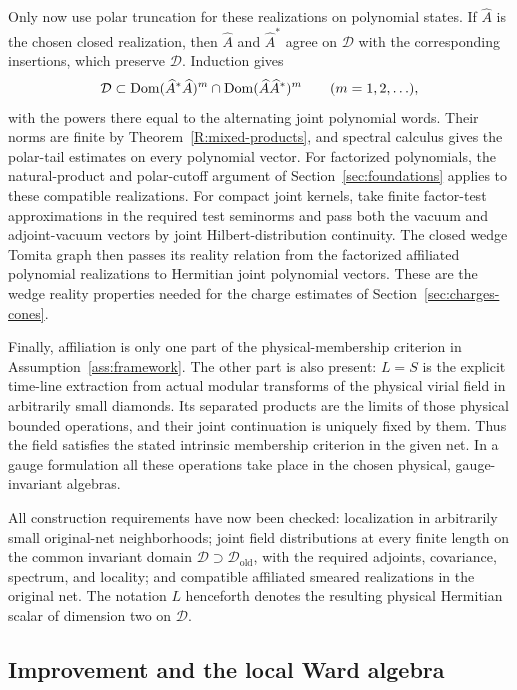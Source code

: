 Only now use polar truncation for these realizations on polynomial
states.  If $\widehat A$ is the chosen closed realization, then
$\widehat A$ and $\widehat A^*$ agree on $\mathcal D$ with the
corresponding insertions, which preserve $\mathcal D$.  Induction gives
\[
 \mathcal D\subset
 \operatorname{Dom}(\widehat A^*\widehat A)^m
       \cap\operatorname{Dom}(\widehat A\widehat A^*)^m
 \qquad(m=1,2,\ldots),
\]
with the powers there equal to the alternating joint polynomial
words.  Their norms are finite by Theorem~\ref{R:mixed-products},
and spectral calculus gives the polar-tail estimates on every
polynomial vector.  For factorized polynomials, the natural-product
and polar-cutoff argument of Section~\ref{sec:foundations} applies to
these compatible realizations.  For compact joint kernels, take finite factor-test
approximations in the required test seminorms and pass both the vacuum
and adjoint-vacuum vectors by joint Hilbert-distribution continuity.
The closed wedge Tomita graph then passes its reality relation from
the factorized affiliated polynomial realizations to Hermitian joint
polynomial vectors.  These are the wedge reality properties needed
for the charge estimates of Section~\ref{sec:charges-cones}.

Finally, affiliation is only one part of the physical-membership
criterion in Assumption~\ref{ass:framework}.  The other part is also
present: $L=S$ is the explicit time-line extraction from actual
modular transforms of the physical virial field in arbitrarily small
diamonds.  Its separated products are the limits of those physical
bounded operations, and their joint continuation is uniquely fixed
by them.  Thus the field satisfies the stated intrinsic membership
criterion in the given net.  In a gauge formulation all these
operations take place in the chosen physical, gauge-invariant
algebras.

All construction requirements have now been checked: localization
in arbitrarily small original-net neighborhoods; joint field distributions
at every finite length on the common invariant domain
$\mathcal D\supset\mathcal D_{\mathrm{old}}$, with the required adjoints,
covariance, spectrum, and locality; and compatible affiliated smeared
realizations in the original net.
The notation $L$ henceforth denotes the resulting physical Hermitian
scalar of dimension two on $\mathcal D$.

\subsection{Improvement and the local Ward algebra}

